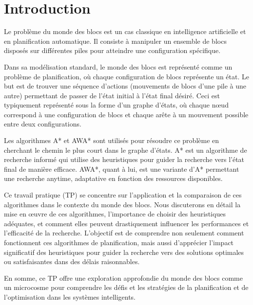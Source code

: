 
\section*{Introduction}
Le problème du monde des blocs est un cas classique en intelligence artificielle et en planification automatique. Il consiste à manipuler un ensemble de blocs disposés sur différentes piles pour atteindre une configuration spécifique.

Dans sa modélisation standard, le monde des blocs est représenté comme un problème de planification, où chaque configuration de blocs représente un état. Le but est de trouver une séquence d'actions (mouvements de blocs d'une pile à une autre) permettant de passer de l'état initial à l'état final désiré. Ceci est typiquement représenté sous la forme d'un graphe d'états, où chaque nœud correspond à une configuration de blocs et chaque arête à un mouvement possible entre deux configurations.

Les algorithmes A* et AWA* sont utilisés pour résoudre ce problème en cherchant le chemin le plus court dans le graphe d'états. A* est un algorithme de recherche informé qui utilise des heuristiques pour guider la recherche vers l'état final de manière efficace. AWA*, quant à lui, est une variante d'A* permettant une recherche anytime, adaptative en fonction des ressources disponibles.

Ce travail pratique (TP) se concentre sur l'application et la comparaison de ces algorithmes dans le contexte du monde des blocs. Nous discuterons en détail la mise en œuvre de ces algorithmes, l'importance de choisir des heuristiques adéquates, et comment elles peuvent drastiquement influencer les performances et l'efficacité de la recherche. L'objectif est de comprendre non seulement comment fonctionnent ces algorithmes de planification, mais aussi d'apprécier l'impact significatif des heuristiques pour guider la recherche vers des solutions optimales ou satisfaisantes dans des délais raisonnables.

En somme, ce TP offre une exploration approfondie du monde des blocs comme un microcosme pour comprendre les défis et les stratégies de la planification et de l'optimisation dans les systèmes intelligents.
